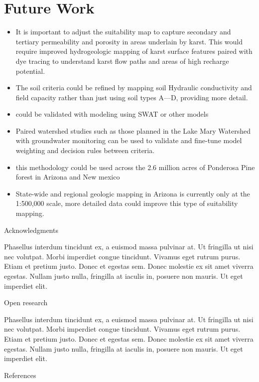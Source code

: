 \documentclass[
  number,
  preprint,
  3p,
  onecolumn]{elsarticle}
\begin{document}
\section{Future Work}\label{future-work}

\begin{itemize}
\item
  It is important to adjust the suitability map to capture secondary and
  tertiary permeability and porosity in areas underlain by karst. This
  would require improved hydrogeologic mapping of karst surface features
  paired with dye tracing to understand karst flow paths and areas of
  high recharge potential.
\item
  The soil criteria could be refined by mapping soil Hydraulic
  conductivity and field capacity rather than just using soil types
  A---D, providing more detail.
\item
  could be validated with modeling using SWAT or other models
\item
  Paired watershed studies such as those planned in the Lake Mary
  Watershed with groundwater monitoring can be used to validate and
  fine-tune model weighting and decision rules between criteria.
\item
  this methodology could be used across the 2.6 million acres of
  Ponderosa Pine forest in Arizona and New mexico
\item
  State-wide and regional geologic mapping in Arizona is currently only
  at the 1:500,000 scale, more detailed data could improve this type of
  suitability mapping.
\end{itemize}

Acknowledgments

Phasellus interdum tincidunt ex, a euismod massa pulvinar at. Ut
fringilla ut nisi nec volutpat. Morbi imperdiet congue tincidunt.
Vivamus eget rutrum purus. Etiam et pretium justo. Donec et egestas sem.
Donec molestie ex sit amet viverra egestas. Nullam justo nulla,
fringilla at iaculis in, posuere non mauris. Ut eget imperdiet elit.

Open research

Phasellus interdum tincidunt ex, a euismod massa pulvinar at. Ut
fringilla ut nisi nec volutpat. Morbi imperdiet congue tincidunt.
Vivamus eget rutrum purus. Etiam et pretium justo. Donec et egestas sem.
Donec molestie ex sit amet viverra egestas. Nullam justo nulla,
fringilla at iaculis in, posuere non mauris. Ut eget imperdiet elit.

References

\renewcommand{\bibsection}{}

\end{document}
